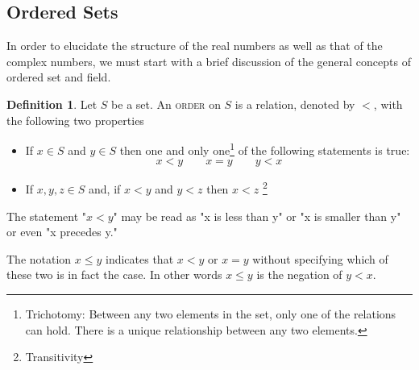\documentclass{tufte-book}
\theoremstyle{definition}
\newtheorem{definition}{Definition}[chapter]
\numberwithin{section}{chapter}
\begin{document}
\subsection{Ordered Sets}\label{sec:sidenotes}
In order to elucidate the structure of the real numbers as well as that of the complex numbers, we must start with a brief discussion of the general concepts of ordered set and field.



\begin{definition}Let $S$ be a set.  An \textsc{order} on $S$ is a relation, denoted by $<$, with the following two properties

\begin{itemize}
	\item  If $x \in S$ and $y \in S$ then one and only one\footnote{Trichotomy: Between any two elements in the set, only one of the relations can hold.  There is a unique relationship between any two elements.} of the following statements is true:	\[	x< y \qquad x=y \qquad y<x\]  
	\item If $x,y,z \in S$ and, if $x<y$ and $y<z$ then $x<z$
	\footnote{Transitivity}
\end{itemize}
\end{definition}


The statement "$x<y$" may be read as "x is less than y" or "x is smaller than y" or even "x precedes y."

The notation $x \leq y$ indicates that $x<y$ or $x=y$ without specifying which of these two is in fact the case.  In other words $x \leq y$ is the negation of $y<x$.
\end{document}
